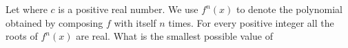 Let  where $c$ is a positive real number.  We use $f^n(x)$ to denote the polynomial obtained by composing $f$ with itself $n$ times.  For every positive integer  all the roots of $f^n(x)$ are real.  What is the smallest possible value of 
